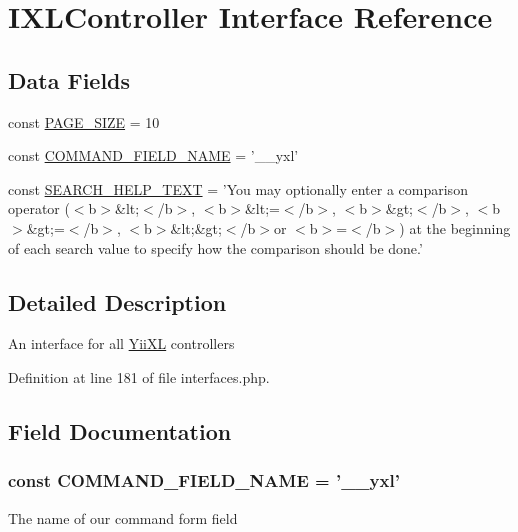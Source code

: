 \hypertarget{interfaceIXLController}{
\section{IXLController Interface Reference}
\label{interfaceIXLController}
}
\subsection*{Data Fields}
\begin{DoxyCompactItemize}
\item 
const \hyperlink{group__Constants_ga4634a091c35db33009455321e1d259e3}{PAGE\_\-SIZE} = 10
\item 
const \hyperlink{interfaceIXLController_acfa3d37fd2964302d32a8905a102196d}{COMMAND\_\-FIELD\_\-NAME} = '\_\-\_\-yxl'
\item 
const \hyperlink{interfaceIXLController_a21930d5a45a39f983d1b157fd28819dc}{SEARCH\_\-HELP\_\-TEXT} = 'You may optionally enter a comparison operator ($<$b$>$\&lt;$<$/b$>$, $<$b$>$\&lt;=$<$/b$>$, $<$b$>$\&gt;$<$/b$>$, $<$b$>$\&gt;=$<$/b$>$, $<$b$>$\&lt;\&gt;$<$/b$>$or $<$b$>$=$<$/b$>$) at the beginning of each search value to specify how the comparison should be done.'
\end{DoxyCompactItemize}


\subsection{Detailed Description}
An interface for all \hyperlink{classYiiXL}{YiiXL} controllers 

Definition at line 181 of file interfaces.php.



\subsection{Field Documentation}
\hypertarget{interfaceIXLController_acfa3d37fd2964302d32a8905a102196d}{
\subsubsection[{COMMAND\_\-FIELD\_\-NAME}]{\setlength{\rightskip}{0pt plus 5cm}const {\bf COMMAND\_\-FIELD\_\-NAME} = '\_\-\_\-yxl'}}
\label{interfaceIXLController_acfa3d37fd2964302d32a8905a102196d}
The name of our command form field 

